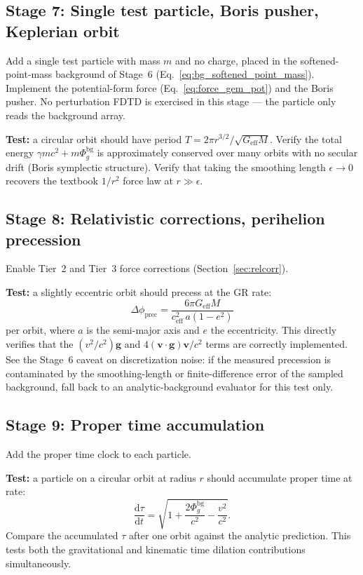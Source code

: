 \documentclass[11pt,a4paper]{article}
\newcommand{\vv}[1]{\mathbf{#1}}
\newcommand{\Phig}{\Phi_g}
\newcommand{\dd}{\mathrm{d}}
\begin{document}
\subsection{Stage 7: Single test particle, Boris pusher, Keplerian orbit}

Add a single test particle with mass $m$ and no charge, placed in the softened-point-mass background of Stage~6 (Eq.~\ref{eq:bg_softened_point_mass}).  Implement the potential-form force (Eq.~\ref{eq:force_gem_pot}) and the Boris pusher.  No perturbation FDTD is exercised in this stage --- the particle only reads the background array.

\textbf{Test:} a circular orbit should have period $T = 2\pi r^{3/2}/\sqrt{G_{\mathrm{eff}}M}$.  Verify the total energy $\gamma mc^2 + m\Phig^{\mathrm{bg}}$ is approximately conserved over many orbits with no secular drift (Boris symplectic structure).  Verify that taking the smoothing length $\epsilon\to0$ recovers the textbook $1/r^2$ force law at $r\gg\epsilon$.

\subsection{Stage 8: Relativistic corrections, perihelion precession}

Enable Tier~2 and Tier~3 force corrections (Section~\ref{sec:relcorr}).

\textbf{Test:} a slightly eccentric orbit should precess at the GR rate:
\begin{equation}
  \Delta\phi_{\mathrm{prec}} = \frac{6\pi G_{\mathrm{eff}} M}{c_{\mathrm{eff}}^2\,a(1-e^2)}
\end{equation}
per orbit, where $a$ is the semi-major axis and $e$ the eccentricity.  This directly verifies that the $(v^2/c^2)\vv{g}$ and $4(\vv{v}\cdot\vv{g})\vv{v}/c^2$ terms are correctly implemented.  See the Stage~6 caveat on discretization noise: if the measured precession is contaminated by the smoothing-length or finite-difference error of the sampled background, fall back to an analytic-background evaluator for this test only.

\subsection{Stage 9: Proper time accumulation}

Add the proper time clock to each particle.

\textbf{Test:} a particle on a circular orbit at radius $r$ should accumulate proper time at rate:
\begin{equation}
  \frac{\dd\tau}{\dd t} = \sqrt{1 + \frac{2\Phig^{\mathrm{bg}}}{c^2} - \frac{v^2}{c^2}}.
\end{equation}
Compare the accumulated $\tau$ after one orbit against the analytic prediction.  This tests both the gravitational and kinematic time dilation contributions simultaneously.
\end{document}
